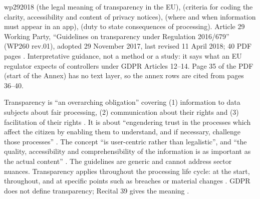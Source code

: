 \begin{papercard}{wp292018}
  (the legal meaning of transparency in the EU),  (criteria for coding the clarity, accessibility and content of privacy notices),  (where and when information must appear in an app),  (duty to state consequences of processing). Article 29 Working Party, ``Guidelines on transparency under Regulation 2016/679'' (WP260 rev.01), adopted 29 November 2017, last revised 11 April 2018; 40 PDF pages . Interpretative guidance, not a method or a study: it says what an EU regulator expects of controllers under GDPR Articles 12--14. Page 35 of the PDF (start of the Annex) has no text layer, so the annex rows are cited from pages 36--40.

 Transparency is ``an overarching obligation'' covering (1) information to data subjects about fair processing, (2) communication about their rights and (3) facilitation of their rights . It is about ``engendering trust in the processes which affect the citizen by enabling them to understand, and if necessary, challenge those processes'' . The concept ``is user-centric rather than legalistic'', and ``the quality, accessibility and comprehensibility of the information is as important as the actual content'' . The guidelines are generic and cannot address sector nuances. Transparency applies throughout the processing life cycle: at the start, throughout, and at specific points such as breaches or material changes . GDPR does not define transparency; Recital 39 gives the meaning .


\end{papercard}
